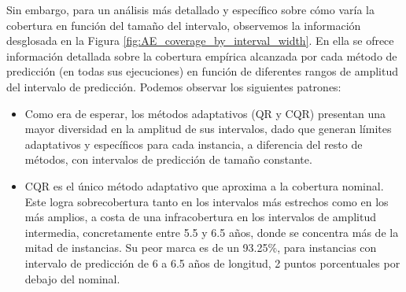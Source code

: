 \FloatBarrier

Sin embargo, para un análisis más detallado y específico sobre cómo varía la cobertura en función del tamaño del intervalo, observemos la información desglosada en la Figura \ref{fig:AE_coverage_by_interval_width}.
En ella se ofrece información detallada sobre la cobertura empírica alcanzada por cada método de predicción (en todas sus ejecuciones) en función de diferentes rangos de amplitud del intervalo de predicción. Podemos observar los siguientes patrones:

\begin{itemize}
    
    \item Como era de esperar, los métodos adaptativos (QR y CQR) presentan una mayor diversidad en la amplitud de sus intervalos, dado que generan límites adaptativos y específicos para cada instancia, a diferencia del resto de métodos, con intervalos de predicción de tamaño constante.
    
    \item CQR es el único método adaptativo que aproxima a la cobertura nominal. Este logra sobrecobertura tanto en los intervalos más estrechos como en los más amplios, a costa de una infracobertura en los intervalos de amplitud intermedia, concretamente entre 5.5 y 6.5 años, donde se concentra más de la mitad de instancias. Su peor marca es de un 93.25\%, para instancias con intervalo de predicción de 6 a 6.5 años de longitud, 2 puntos porcentuales por debajo del nominal. 

\end{itemize}

